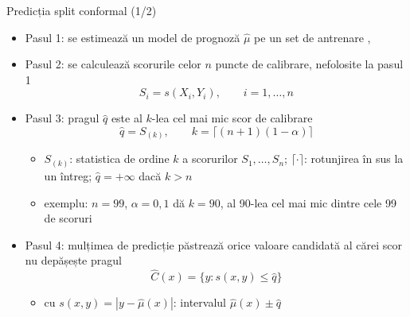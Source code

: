 \begin{frame}{Predicția split conformal (1/2)}
\itemsize{\small}
\begin{itemize}
    \item Pasul 1: se estimează un model de prognoză $\hat\mu$ pe un set de antrenare , 
    \item Pasul 2: se calculează scorurile celor $n$ puncte de calibrare, nefolosite la pasul 1 \[ S_i = s(X_i, Y_i), \qquad i = 1, \dots, n \]
    \item Pasul 3: pragul $\hat q$ este al $k$-lea cel mai mic scor de calibrare \[ \hat q = S_{(k)}, \qquad k = \lceil (n + 1)(1 - \alpha) \rceil \]
    \begin{itemize}
        \item $S_{(k)}$: statistica de ordine $k$ a scorurilor $S_1, \dots, S_n$; $\lceil\cdot\rceil$: rotunjirea în sus la un întreg; $\hat q = +\infty$ dacă $k > n$
        \item exemplu: $n = 99$, $\alpha = 0{,}1$ dă $k = 90$, al 90-lea cel mai mic dintre cele 99 de scoruri
    \end{itemize}
    \item Pasul 4: mulțimea de predicție păstrează orice valoare candidată al cărei scor nu depășește pragul \[ \hat C(x) = \{y: s(x, y) \le \hat q\} \]
    \begin{itemize}
        \item cu $s(x, y) = |y - \hat\mu(x)|$: intervalul $\hat\mu(x) \pm \hat q$
    \end{itemize}
\end{itemize}
\end{frame}


